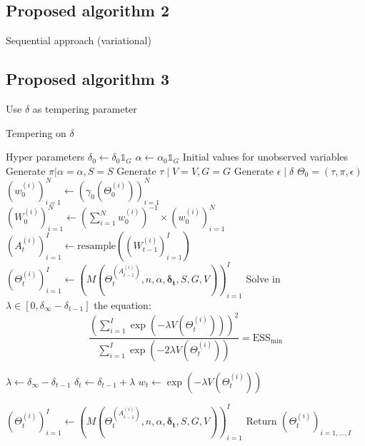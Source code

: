 \documentclass{article}
\begin{document}
\subsection{Proposed algorithm 2}
Sequential approach (variational)
\subsection{Proposed algorithm 3}
Use $\delta$ as tempering parameter


\begin{algorithm}[H]
\caption{ Tempering on $\delta$}
\begin{algorithmic}

\State Hyper parameters
\Indent
\State $\delta_0\gets \delta_0 \mathds{1}_G$
\State $\alpha\gets \alpha_0\mathds{1}_G$ 
\EndIndent
\State Initial values for unobserved variables
\Indent
\State Generate $\pi|\alpha=\alpha,S=S$ 
\State Generate $\tau\mid V=V,G=G$
\State Generate $\epsilon\mid\delta$
\State $\Theta_0=(\tau,\pi,\epsilon)$
\State $(w_0^{(i)})_{i=1}^N\gets \left(\gamma_0(\Theta_0^{(i)})\right)_{i=1}^N$
\State $(W_0^{(i)})_{i=1}^N\gets \left(\sum_{i=1}^N w_0^{(i)}\right)^{-1}\times \left(w_0^{(i)}\right)_{i=1}^N$
\EndIndent
\EndStep
{}
        \State $\left(A_{t}^{(i)}\right)_{i=1}^I\gets \mathrm{resample}\left(\left(W_{t-1}^{(i)}\right)_{i=1}^I\right)$
         \State $\left(\Theta_{t}^{(i)}\right)_{i=1}^I\gets \left(M\left(\Theta_{t}^{(A_{t-1}^{(i)})},n,\alpha,\mathbf{\delta_t},S,G,V\right)\right)_{i=1}^I$
\State Solve in $\lambda\in[0,\delta_\infty-\delta_{t-1}]$ the equation: 
 $$\frac{\left(\sum_{i=1}^I\exp\left(-\lambda V(\Theta_t^{(i)})\right)\right)^2}{\sum_{i=1}^I\exp\left(-2\lambda V(\Theta_t^{(i)})\right)}=\mathrm{ESS}_{\mathrm{min}}$$

\State $\lambda\gets\delta_\infty-\delta_{t-1}$
\EndIf
\State $\delta_t\gets \delta_{t-1}+\lambda$
\State $w_t\gets \exp\left(-\lambda V(\Theta_t^{(i)})\right)$

\EndWhile
    \State $\left(\Theta_{t}^{(i)}\right)_{i=1}^I\gets \left(M\left(\Theta_{t}^{(A_{t-1}^{(i)})},n,\alpha,\mathbf{\delta_t},S,G,V\right)\right)_{i=1}^I$
\EndFor    
\EndStep
Return $\left(\Theta_{t}^{(i)}\right)_{i=1,\ldots,I}$
\EndProcedure
\end{algorithmic}
\end{algorithm}
\end{document}
